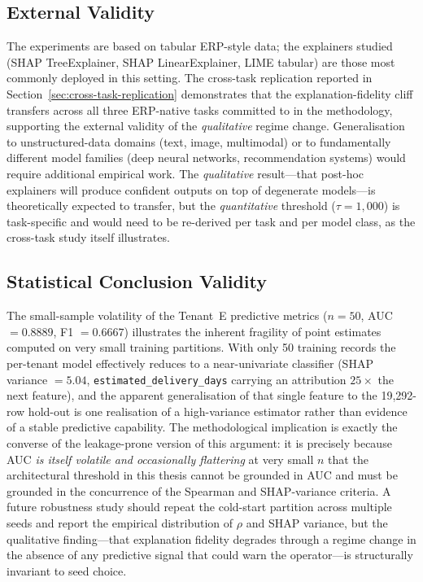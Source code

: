 \subsection{External Validity}
\label{subsec:external-validity}

The experiments are based on tabular ERP-style data; the explainers studied
(SHAP TreeExplainer, SHAP LinearExplainer, LIME tabular) are those most
commonly deployed in this setting. The cross-task replication reported in
Section~\ref{sec:cross-task-replication} demonstrates that the
explanation-fidelity cliff transfers across all three ERP-native tasks
committed to in the methodology, supporting the external validity of the
\emph{qualitative} regime change. Generalisation to unstructured-data
domains (text, image, multimodal) or to fundamentally different model
families (deep neural networks, recommendation systems) would require
additional empirical work. The \emph{qualitative} result---that post-hoc
explainers will produce confident outputs on top of degenerate models---is
theoretically expected to transfer, but the \emph{quantitative} threshold
($\tau = 1{,}000$) is task-specific and would
need to be re-derived per task and per model class, as the cross-task
study itself illustrates.

\subsection{Statistical Conclusion Validity}
\label{subsec:statistical-conclusion}

The small-sample volatility of the Tenant~E predictive metrics
($n = 50$, AUC $= 0.8889$, F1 $= 0.6667$) illustrates the inherent
fragility of point estimates computed on very small training partitions.
With only 50 training records the per-tenant model effectively reduces to
a near-univariate classifier (SHAP variance $= 5.04$,
\texttt{estimated\_delivery\_days} carrying an attribution $25\times$ the
next feature), and the apparent generalisation of that single feature to
the 19{,}292-row hold-out is one realisation of a high-variance estimator
rather than evidence of a stable predictive capability. The methodological
implication is exactly the converse of the leakage-prone version of this
argument: it is precisely because AUC \emph{is itself volatile and
occasionally flattering} at very small $n$ that the architectural
threshold in this thesis cannot be grounded in AUC and must be grounded
in the concurrence of the Spearman and SHAP-variance criteria. A future
robustness study should repeat the cold-start partition across multiple
seeds and report the empirical distribution of $\rho$ and SHAP variance,
but the qualitative finding---that explanation fidelity degrades through
a regime change in the absence of any predictive signal that could warn
the operator---is structurally invariant to seed choice.

